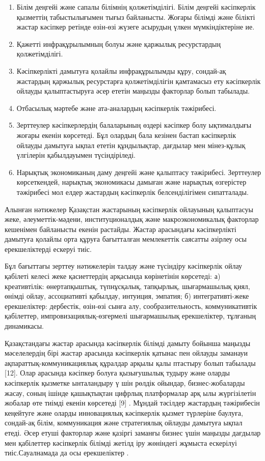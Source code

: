 \begin{enumerate}
\def\labelenumi{\arabic{enumi}.}
\item
  Білім деңгейі және сапалы білімнің қолжетімділігі. Білім деңгейі
  кәсіпкерлік қызметтің табыстылығымен тығыз байланысты. Жоғары білімді
  және білікті жастар кәсіпкер ретінде өзін-өзі жүзеге асырудың үлкен
  мүмкіндіктеріне ие.
\item
  Қажетті инфрақұрылымның болуы және қаржылық ресурстардың
  қолжетімділігі.
\item
  Кәсіпкерлікті дамытуға қолайлы инфрақұрылымды құру, сондай-ақ
  жастардың қаржылық ресурстарға қолжетімділігін қамтамасыз ету
  кәсіпкерлік ойлауды қалыптастыруға әсер ететін маңызды факторлар болып
  табылады.
\item
  Отбасылық мәртебе және ата-аналардың кәсіпкерлік тәжірибесі.
\item
  Зерттеулер кәсіпкерлердің балаларының өздері кәсіпкер болу ықтималдығы
  жоғары екенін көрсетеді. Бұл олардың бала кезінен бастап кәсіпкерлік
  ойлауды дамытуға ықпал ететін құндылықтар, дағдылар мен мінез-құлық
  үлгілерін қабылдауымен түсіндіріледі.
\item
  Нарықтық экономиканың даму деңгейі және қалыптасу тәжірибесі.
  Зерттеулер көрсеткендей, нарықтық экономикасы дамыған және нарықтық
  өзгерістер тәжірибесі мол елдер жастардың кәсіпкерлік белсенділігімен
  сипатталады.
\end{enumerate}

Алынған нәтижелер Қазақстан жастарының кәсіпкерлік ойлауының қалыптасуы
жеке, әлеуметтік-мәдени, институционалдық және макроэкономикалық
факторлар кешенімен байланысты екенін растайды. Жастар арасындағы
кәсіпкерлікті дамытуға қолайлы орта құруға бағытталған мемлекеттік
саясатты әзірлеу осы ерекшеліктерді ескеруі тиіс.

Бұл бағыттағы зерттеу нәтижелерін талдау және түсіндіру кәсіпкерлік
ойлау қабілеті келесі жеке қасиеттердің арқасында көрінетінін көрсетеді:
а) креативтілік: өнертапқыштық, түпнұсқалық, тапқырлық, шығармашылық
қиял, өнімді ойлау, ассоциативті қабылдау, интуиция, эмпатия; б)
интегративті-жеке ерекшеліктер: дербестік, өзін-өзі сынға алу,
сообразительность, коммуникативтік қабілеттер, импровизациялық-өзгермелі
шығармашылық ерекшеліктер, тұлғаның динамикасы.

Қазақстандағы жастар арасында кәсіпкерлік білімді дамыту бойынша маңызды
мәселелердің бірі жастар арасында кәсіпкерлік қатынас пен ойлауды
заманауи ақпараттық-коммуникациялық құралдар арқылы қалы птастыру болып
табылады {[}12{]}. Олар арасында кәсіпкер болуға қызығушылық тудыру және
оларды кәсіпкерлік қызметке ынталандыру ү шін рөлдік ойындар,
бизнес-жобаларды жасау, соның ішінде қашықтықтан цифрлық платформалар
арқ ылы жүргізілетін жобалар өте тиімді екенін көрсетеді {[}9{]} .
Мұндай тәсілдер жастардың тәжірибесін кеңейтуге және оларды инновациялық
кәсіпкерлік қызмет түрлеріне баулуға, сондай-ақ білім, коммуникация және
стратегиялық ойлауды дамытуға ықпал етеді. Әсер етуші факторлар және
қазіргі заманғы бизнес үшін маңызды дағдылар мен қабілеттер кәсіпкерлік
білімді жетілд іру жөніндегі жұмыста ескерілуі тиіс.Сауалнамада да осы
ерекшеліктер .


